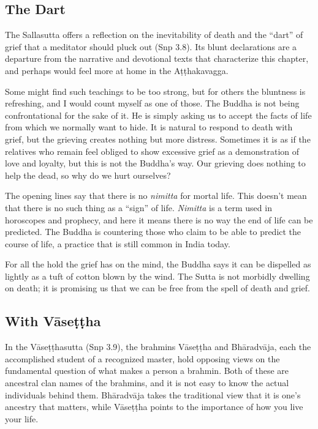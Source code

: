 \documentclass[12pt,openany]{book}%
\begin{document}
\subsection*{The Dart}

The Sallasutta offers a reflection on the inevitability of death and the “dart” of grief that a meditator should pluck out (Snp 3.8). Its blunt declarations are a departure from the narrative and devotional texts that characterize this chapter, and perhaps would feel more at home in the \textsanskrit{Aṭṭhakavagga}.

Some might find such teachings to be too strong, but for others the bluntness is refreshing, and I would count myself as one of those. The Buddha is not being confrontational for the sake of it. He is simply asking us to accept the facts of life from which we normally want to hide. It is natural to respond to death with grief, but the grieving creates nothing but more distress. Sometimes it is as if the relatives who remain feel obliged to show excessive grief as a demonstration of love and loyalty, but this is not the Buddha’s way. Our grieving does nothing to help the dead, so why do we hurt ourselves?

The opening lines say that there is no \textit{nimitta} for mortal life. This doesn’t mean that there is no such thing as a “sign” of life. \textit{Nimitta} is a term used in horoscopes and prophecy, and here it means there is no way the end of life can be predicted. The Buddha is countering those who claim to be able to predict the course of life, a practice that is still common in India today.

For all the hold the grief has on the mind, the Buddha says it can be dispelled as lightly as a tuft of cotton blown by the wind. The Sutta is not morbidly dwelling on death; it is promising us that we can be free from the spell of death and grief.

\subsection*{With \textsanskrit{Vāseṭṭha}}

In the \textsanskrit{Vāseṭṭhasutta} (Snp 3.9), the brahmins \textsanskrit{Vāseṭṭha} and \textsanskrit{Bhāradvāja}, each the accomplished student of a recognized master, hold opposing views on the fundamental question of what makes a person a brahmin. Both of these are ancestral clan names of the brahmins, and it is not easy to know the actual individuals behind them. \textsanskrit{Bhāradvāja} takes the traditional view that it is one’s ancestry that matters, while \textsanskrit{Vāseṭṭha} points to the importance of how you live your life.
\end{document}
